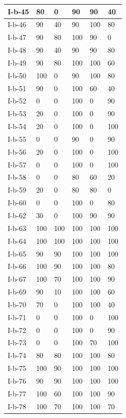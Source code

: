 \documentclass[11pt,a4paper]{article}
\begin{document}
\begin{table}[h]
\begin{tabular}{|l|l|l|l|l|l|}
I-b-45 & 80 & 0 & 90 & 90 & 40 \\ \hline
I-b-46 & 90 & 40 & 90 & 100 & 80 \\ \hline
I-b-47 & 90 & 80 & 100 & 90 & 0 \\ \hline
I-b-48 & 90 & 40 & 90 & 90 & 80 \\ \hline
I-b-49 & 90 & 80 & 100 & 100 & 60 \\ \hline
I-b-50 & 100 & 0 & 90 & 100 & 80 \\ \hline
I-b-51 & 90 & 0 & 100 & 60 & 40 \\ \hline
I-b-52 & 0 & 0 & 100 & 0 & 90 \\ \hline
I-b-53 & 20 & 0 & 100 & 0 & 90 \\ \hline
I-b-54 & 20 & 0 & 100 & 0 & 100 \\ \hline
I-b-55 & 0 & 0 & 90 & 0 & 90 \\ \hline
I-b-56 & 20 & 0 & 100 & 0 & 100 \\ \hline
I-b-57 & 0 & 0 & 100 & 0 & 100 \\ \hline
I-b-58 & 0 & 0 & 80 & 60 & 20 \\ \hline
I-b-59 & 20 & 0 & 80 & 80 & 0 \\ \hline
I-b-60 & 0 & 0 & 100 & 0 & 80 \\ \hline
I-b-62 & 30 & 0 & 100 & 90 & 90 \\ \hline
I-b-63 & 100 & 100 & 100 & 100 & 100 \\ \hline
I-b-64 & 100 & 100 & 100 & 100 & 100 \\ \hline
I-b-65 & 90 & 90 & 100 & 100 & 100 \\ \hline
I-b-66 & 100 & 90 & 100 & 100 & 80 \\ \hline
I-b-67 & 100 & 70 & 100 & 100 & 90 \\ \hline
I-b-69 & 90 & 10 & 100 & 100 & 60 \\ \hline
I-b-70 & 70 & 0 & 100 & 100 & 40 \\ \hline
I-b-71 & 0 & 0 & 100 & 0 & 100 \\ \hline
I-b-72 & 0 & 0 & 100 & 0 & 90 \\ \hline
I-b-73 & 0 & 0 & 100 & 70 & 100 \\ \hline
I-b-74 & 80 & 80 & 100 & 100 & 80 \\ \hline
I-b-75 & 100 & 90 & 100 & 100 & 100 \\ \hline
I-b-76 & 90 & 90 & 100 & 100 & 100 \\ \hline
I-b-77 & 100 & 60 & 100 & 100 & 90 \\ \hline
I-b-78 & 100 & 70 & 100 & 100 & 70 \\ \hline

\end{tabular}
\end{table}
\end{document}
